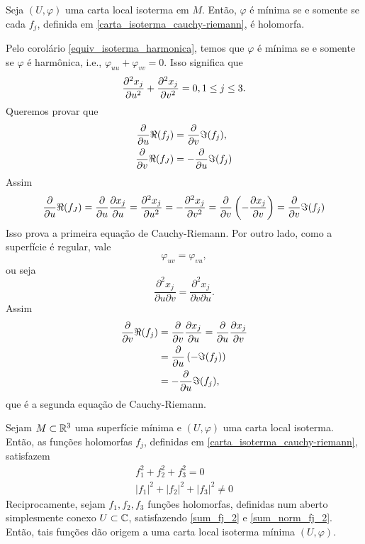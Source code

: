 \begin{lema}
	Seja $(U, \varphi)$ uma carta local isoterma em $M$. Então, $\varphi$ é mínima se e somente se cada $f_j$, definida em \eqref{carta_isoterma_cauchy-riemann}, é holomorfa.
\end{lema}

\begin{demonstracao}
	Pelo corolário \ref{equiv_isoterma_harmonica}, temos que $\varphi$ é mínima se e somente se $\varphi$ é harmônica, i.e., $\varphi_{uu} + \varphi_{vv} = 0$. Isso significa que
	\begin{equation*}
	\frac{\partial^2 x_j}{\partial u^2} + \frac{\partial^2 x_j}{\partial v^2} = 0, 1 \leq j \leq 3.
	\end{equation*}
	Queremos provar que
	\begin{align*}
	\frac{\partial}{\partial u} \Re(f_j) &= \frac{\partial}{\partial v} \Im(f_j),\\
	\frac{\partial}{\partial v} \Re(f_J) &= - \frac{\partial}{\partial u} \Im(f_j)
	\end{align*}
	Assim
	\begin{equation*}
	\frac{\partial}{\partial u} \Re(f_J) = \frac{\partial}{\partial u} \frac{\partial x_j}{\partial u} = \frac{\partial^2 x_j}{\partial u^2} = - \frac{\partial^2 x_j}{\partial v^2} = \frac{\partial}{\partial v} \left( - \frac{\partial x_j}{\partial v} \right) = \frac{\partial}{\partial v} \Im(f_j)
	\end{equation*}
	Isso prova a primeira equação de Cauchy-Riemann. Por outro lado, como a superfície é regular, vale
	\begin{equation*}
	\varphi_{uv} = \varphi_{vu},
	\end{equation*}
	ou seja
	\begin{equation*}
	\frac{\partial^2 x_j}{\partial u \partial v} = \frac{\partial^2 x_j}{\partial v \partial u}.
	\end{equation*}
	Assim
	\begin{align*}
	\frac{\partial}{\partial v} \Re(f_j) &= \frac{\partial}{\partial v} \frac{\partial x_j}{\partial u} = \frac{\partial}{\partial u} \frac{\partial x_j}{\partial v}\\
	&= \frac{\partial}{\partial u} \left( - \Im(f_j) \right)\\
	&= - \frac{\partial}{\partial u} \Im(f_j),
	\end{align*}
	que é a segunda equação de Cauchy-Riemann.
\end{demonstracao}

\begin{lema}\label{lema_fj_2}
	Sejam $M \subset \mathbb{R}^3$ uma superfície mínima e $(U, \varphi)$ uma carta local isoterma. Então, as funções holomorfas $f_j$, definidas em \eqref{carta_isoterma_cauchy-riemann}, satisfazem
	\begin{gather}\label{sum_fj_2}
	f_1^2 + f_2^2 + f_3^2 = 0\\ \label{sum_norm_fj_2}
	|f_1|^2 + |f_2|^2 + |f_3|^2 \neq 0
	\end{gather}
	Reciprocamente, sejam $f_1, f_2, f_3$ funções holomorfas, definidas num aberto simplesmente conexo $U \subset \mathbb{C}$, satisfazendo \eqref{sum_fj_2} e \eqref{sum_norm_fj_2}. Então, tais funções dão origem a uma carta local isoterma mínima $(U, \varphi)$.
\end{lema}

